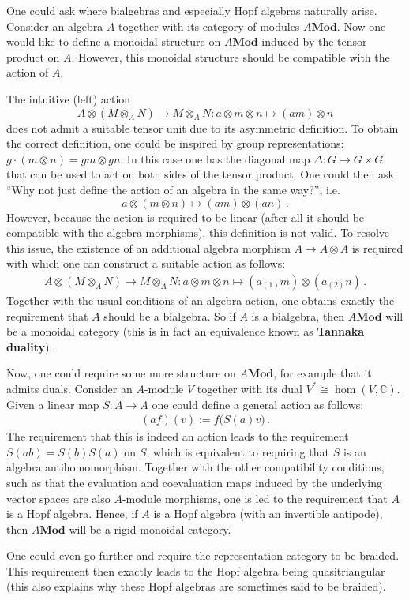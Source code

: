     \begin{remark}
        One could ask where bialgebras and especially Hopf algebras naturally arise. Consider an algebra $A$ together with its category of modules $A\mathbf{Mod}$. Now one would like to define a monoidal structure on $A\mathbf{Mod}$ induced by the tensor product on $A$. However, this monoidal structure should be compatible with the action of $A$.

        The intuitive (left) action \[A\otimes(M\otimes_A N)\rightarrow M\otimes_AN: a\otimes m\otimes n\mapsto (am)\otimes n\] does not admit a suitable tensor unit due to its asymmetric definition. To obtain the correct definition, one could be inspired by group representations: $g\cdot(m\otimes n) = gm\otimes gn$. In this case one has the diagonal map $\Delta:G\rightarrow G\times G$ that can be used to act on both sides of the tensor product. One could then ask ``Why not just define the action of an algebra in the same way?'', i.e.~\[a\otimes (m\otimes n)\mapsto (am)\otimes(an)\,.\] However, because the action is required to be linear (after all it should be compatible with the algebra morphisms), this definition is not valid. To resolve this issue, the existence of an additional algebra morphism $A\rightarrow A\otimes A$ is required with which one can construct a suitable action as follows:
        \begin{gather}
            A\otimes(M\otimes_AN)\rightarrow M\otimes_AN:a\otimes m\otimes n\mapsto (a_{(1)}m)\otimes(a_{(2)}n)\,.
        \end{gather}
        Together with the usual conditions of an algebra action, one obtains exactly the requirement that $A$ should be a bialgebra. So if $A$ is a bialgebra, then $A\mathbf{Mod}$ will be a monoidal category (this is in fact an equivalence known as \textbf{Tannaka duality}).

        Now, one could require some more structure on $A\mathbf{Mod}$, for example that it admits duals. Consider an $A$-module $V$ together with its dual $V^*\cong\hom(V,\mathbb{C})$. Given a linear map $S:A\rightarrow A$ one could define a general action as follows:
        \begin{gather}
            (af)(v) := f\bigl(S(a)v\bigr)\,.
        \end{gather}
        The requirement that this is indeed an action leads to the requirement $S(ab)=S(b)S(a)$ on $S$, which is equivalent to requiring that $S$ is an algebra antihomomorphism. Together with the other compatibility conditions, such as that the evaluation and coevaluation maps induced by the underlying vector spaces are also $A$-module morphisms, one is led to the requirement that $A$ is a Hopf algebra. Hence, if $A$ is a Hopf algebra (with an invertible antipode), then $A\mathbf{Mod}$ will be a rigid monoidal category.

        One could even go further and require the representation category to be braided. This requirement then exactly leads to the Hopf algebra being quasitriangular (this also explains why these Hopf algebras are sometimes said to be braided).
    \end{remark}

